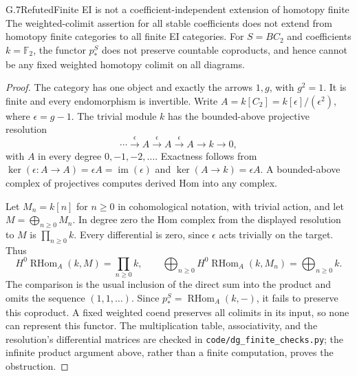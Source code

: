 \begin{claim}{G.7}{Refuted}{Finite EI is not a coefficient-independent extension of homotopy finite}
The weighted-colimit assertion for all stable coefficients does not
extend from homotopy finite categories to all finite EI categories.
For $S=BC_2$ and coefficients $k=\mathbb F_2$, the functor $p_*^S$
does not preserve countable coproducts, and hence cannot be any
fixed weighted homotopy colimit on all diagrams.
\end{claim}
\begin{proof}
The category has one object and exactly the arrows $1,g$, with
$g^2=1$. It is finite and every endomorphism is invertible. Write
$A=k[C_2]=k[\epsilon]/(\epsilon^2)$, where $\epsilon=g-1$.
The trivial module $k$ has the bounded-above projective resolution
\[
 \cdots\xrightarrow{\epsilon}A\xrightarrow{\epsilon}A
 \xrightarrow{\epsilon}A\longrightarrow k\longrightarrow0,
\]
with $A$ in every degree $0,-1,-2,\ldots$. Exactness follows from
$\ker(\epsilon:A\to A)=\epsilon A=\operatorname{im}(\epsilon)$
and $\ker(A\to k)=\epsilon A$. A bounded-above complex of
projectives computes derived Hom into any complex.

Let $M_n=k[n]$ for $n\geq0$ in cohomological notation, with
trivial action, and let $M=\bigoplus_{n\geq0}M_n$.
In degree zero the Hom complex from the displayed resolution to
$M$ is $\prod_{n\geq0}k$. Every differential is zero, since
$\epsilon$ acts trivially on the target. Thus
\[
 H^0\operatorname{RHom}_A(k,M)=\prod_{n\geq0}k,
 \qquad
 \bigoplus_{n\geq0}H^0\operatorname{RHom}_A(k,M_n)
       =\bigoplus_{n\geq0}k.
\]
The comparison is the usual inclusion of the direct sum into the
product and omits the sequence $(1,1,\ldots)$. Since
$p_*^S=\operatorname{RHom}_A(k,-)$, it fails to preserve this
coproduct. A fixed weighted coend preserves all colimits in its
input, so none can represent this functor. The multiplication table,
associativity, and the resolution's differential matrices are checked
in \texttt{code/dg\_finite\_checks.py}; the infinite product argument
above, rather than a finite computation, proves the obstruction.
\end{proof}

